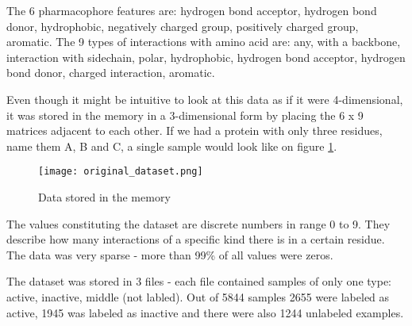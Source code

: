 \documentclass[a4paper,10pt]{report}
\begin{document}
	The 6 pharmacophore features are: hydrogen bond acceptor, hydrogen bond donor, hydrophobic, negatively charged group, positively charged group, aromatic. The 9 types of interactions with amino acid are: any, with a backbone, interaction with sidechain, polar, hydrophobic, hydrogen bond acceptor, hydrogen bond donor, charged interaction, aromatic. 
	
	Even though it might be intuitive to look at this data as if it were 4-dimensional, it was stored in the memory in a 3-dimensional form by placing the 6 x 9 matrices adjacent to each other. If we had a protein with only three residues, name them A, B and C, a single sample would look like on figure \ref{fig:data_original}. 
	
	\begin{figure}[h!]
	  \centering
	  \texttt{[image: original\_dataset.png]}
	  \caption{Data stored in the memory}
	  \label{fig:data_original}
	\end{figure} 
	
	The values constituting the dataset are discrete numbers in range 0 to 9. They describe how many interactions of a specific kind there is in a certain residue. The data was very sparse - more than 99\% of all values were zeros. 
	
	The dataset was stored in 3 files - each file contained samples of only one type: active, inactive, middle (not labled). Out of 5844 samples 2655 were labeled as active, 1945 was labeled as inactive and there were also 1244 unlabeled examples. 
	

	

	    
           
\end{document}
